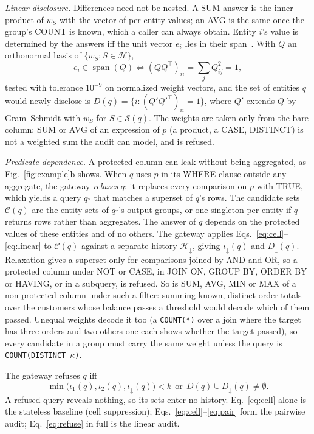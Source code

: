 \documentclass[10pt,journal,compsoc]{IEEEtran}
\begin{document}
\emph{Linear disclosure.} Differences need not be nested. A SUM answer is the inner product of $w_S$ with the vector of per-entity values; an AVG is the same once the group's COUNT is known, which a caller can always obtain. Entity $i$'s value is determined by the answers iff the unit vector $e_i$ lies in their span~\cite{chin1982auditing}. With $Q$ an orthonormal basis of $\{w_S:S\in\mathcal{H}\}$,
\begin{equation}\label{eq:linear}
e_i\in\operatorname{span}(Q)\iff (QQ^{\top})_{ii}=\textstyle\sum_j Q_{ij}^2=1,
\end{equation}
tested with tolerance $10^{-9}$ on normalized weight vectors, and the set of entities $q$ would newly disclose is $D(q)=\{i: (Q'Q'^{\top})_{ii}=1\}$, where $Q'$ extends $Q$ by Gram--Schmidt with $w_S$ for $S\in\mathcal{S}(q)$. The weights are taken only from the bare column: SUM or AVG of an expression of $p$ (a product, a CASE, DISTINCT) is not a weighted sum the audit can model, and is refused.

\emph{Predicate dependence.} A protected column can leak without being aggregated, as Fig.~\ref{fig:example}b shows. When $q$ uses $p$ in its WHERE clause outside any aggregate, the gateway \emph{relaxes} $q$: it replaces every comparison on $p$ with TRUE, which yields a query $q^{\downarrow}$ that matches a superset of $q$'s rows. The candidate sets $\mathcal{C}(q)$ are the entity sets of $q^{\downarrow}$'s output groups, or one singleton per entity if $q$ returns rows rather than aggregates. The answer of $q$ depends on the protected values of these entities and of no others. The gateway applies Eqs.~\ref{eq:cell}--\ref{eq:linear} to $\mathcal{C}(q)$ against a separate history $\mathcal{H}_{\downarrow}$, giving $\iota_{\downarrow}(q)$ and $D_{\downarrow}(q)$. Relaxation gives a superset only for comparisons joined by AND and OR, so a protected column under NOT or CASE, in JOIN ON, GROUP BY, ORDER BY or HAVING, or in a subquery, is refused. So is SUM, AVG, MIN or MAX of a non-protected column under such a filter: summing known, distinct order totals over the customers whose balance passes a threshold would decode which of them passed. Unequal weights decode it too (a \texttt{COUNT(*)} over a join where the target has three orders and two others one each shows whether the target passed), so every candidate in a group must carry the same weight unless the query is \texttt{COUNT(DISTINCT}~$\kappa$\texttt{)}.

The gateway refuses $q$ iff
\begin{equation}\label{eq:refuse}
\min\bigl(\iota_1(q),\iota_2(q),\iota_{\downarrow}(q)\bigr)<k \ \ \text{or}\ \ D(q)\cup D_{\downarrow}(q)\ne\emptyset .
\end{equation}
A refused query reveals nothing, so its sets enter no history. Eq.~\ref{eq:cell} alone is the stateless baseline (cell suppression); Eqs.~\ref{eq:cell}--\ref{eq:pair} form the pairwise audit; Eq.~\ref{eq:refuse} in full is the linear audit.
\end{document}
